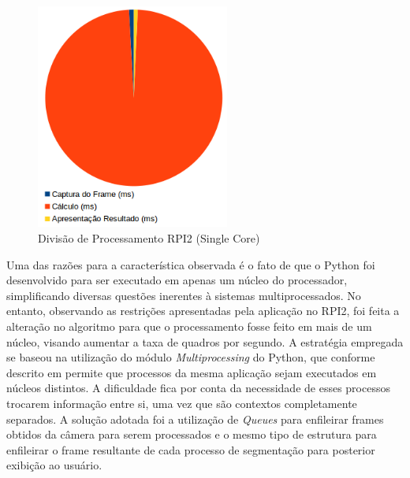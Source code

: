 \documentclass[conference]{IEEEtran}
\begin{document}
\begin{figure}[!t]
\centering
\includegraphics[width=2.5in]{Grafico_processamento_rpi2_single_core}
\caption{Divisão de Processamento RPI2 (Single Core)}
\label{fig:processamento_rpi}
\end{figure}



Uma das razões para a característica observada é o fato de que o Python foi desenvolvido para ser executado em apenas um núcleo do processador, simplificando diversas questões inerentes à sistemas multiprocessados. No entanto, observando as restrições apresentadas pela aplicação no RPI2, foi feita a alteração no algoritmo para que o processamento fosse feito em mais de um núcleo, visando aumentar a taxa de quadros por segundo. A estratégia empregada se baseou na utilização do módulo \textit{Multiprocessing} do Python, que conforme descrito em \cite{IEEEhowto:micha} permite que processos da mesma aplicação sejam executados em núcleos distintos. A dificuldade fica por conta da necessidade de esses processos trocarem informação entre si, uma vez que são contextos completamente separados. A solução adotada foi a utilização de \textit{Queues} para enfileirar frames obtidos da câmera para serem processados e o mesmo tipo de estrutura para enfileirar o frame resultante de cada processo de segmentação para posterior exibição ao usuário. 
\end{document}

